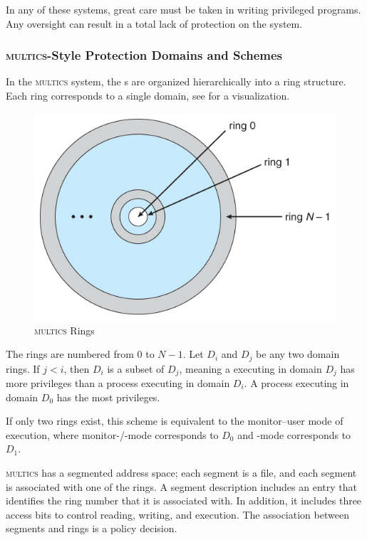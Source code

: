 In any of these systems, great care must be taken in writing privileged programs.
Any oversight can result in a total lack of protection on the system.

\subsubsection{\textsc{multics}-Style Protection Domains and Schemes}\label{subsubsec:MULTICS_Protections}
In the \textsc{multics} system, the s are organized hierarchically into a ring structure.
Each ring corresponds to a single domain, see  for a visualization.

\begin{figure}[h!tbp]
  \centering
  \includegraphics[scale=1.00]{./Drawings/EDAF35-Operating_Systems/MULTICS_Rings.jpg}
  \caption{\textsc{multics} Rings}
  \label{fig:MULTICS_Rings}
\end{figure}

The rings are numbered from 0 to $N-1$.
Let $D_{i}$ and $D_{j}$ be any two domain rings.
If $j < i$, then $D_{i}$ is a subset of $D_{j}$, meaning a  executing in domain $D_{j}$ has more privileges than a process executing in domain $D_{i}$.
A process executing in domain $D_{0}$ has the most privileges.
\begin{remark*}
  If only two rings exist, this scheme is equivalent to the monitor–user mode of execution, where monitor-/-mode corresponds to $D_{0}$ and -mode corresponds to $D_{1}$.
\end{remark*}

\textsc{multics} has a segmented address space; each segment is a file, and each segment is associated with one of the rings.
A segment description includes an entry that identifies the ring number that it is associated with.
In addition, it includes three access bits to control reading, writing, and execution.
The association between segments and rings is a policy decision.

